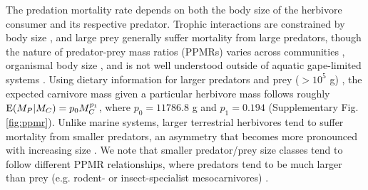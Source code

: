 \documentclass[11pt]{article}
\begin{document}
The predation mortality rate depends on both the body size of the herbivore consumer and its respective predator. 
Trophic interactions are constrained by body size \citep{Sinclair2003,Brose2005,Hatton:2015fk}, and large prey generally suffer mortality from large predators, though the nature of predator-prey mass ratios (PPMRs) varies across communities \citep{barnes2010global}, organismal body size \citep{Brose2005,Rohr2010,Yeakel2014,pires2015pleistocene}, and is not well understood outside of aquatic gape-limited systems \citep{nakazawa2017individual}.
Using dietary information for larger predators and prey ($>10^5$ g) \citep{Hayward2005,Hayward2006,Hayward2008}, the expected carnivore mass given a particular herbivore mass follows roughly ${\rm E}(M_P|M_C) = p_0 M_C^{p_1}$, where $p_0 = 11786.8$ g and $p_1 = 0.194$ (Supplementary Fig. \ref{fig:ppmr}). %
Unlike marine systems, larger terrestrial herbivores tend to suffer mortality from smaller predators, an asymmetry that becomes more pronounced with increasing size \citep[cf. ][]{Sinclair2003}.
We note that smaller predator/prey size classes tend to follow different PPMR relationships, where predators tend to be much larger than prey (e.g. rodent- or insect-specialist mesocarnivores) \citep{cruz2022geography,Cruz2022}.


\end{document}
